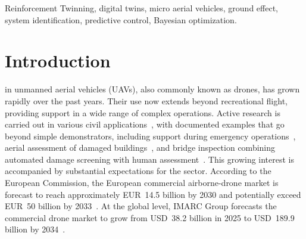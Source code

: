 \documentclass[journal]{IEEEtran}
\begin{document}
\begin{IEEEkeywords}Reinforcement Twinning, digital twins, micro aerial vehicles, ground effect, system identification, predictive control, Bayesian optimization.\end{IEEEkeywords}

\IEEEpeerreviewmaketitle

\section{Introduction}
\label{Introduction}

 in unmanned aerial vehicles (UAVs), also commonly known as drones, has grown rapidly over the past years. Their use now extends beyond recreational flight, providing support in a wide range of complex operations. Active research is carried out in various civil applications~\cite{Shakhatreh2019}, with documented examples that go beyond simple demonstrators, including support during emergency operations~\cite{Ray2022}, aerial assessment of damaged buildings~\cite{Surmann2024}, and bridge inspection combining automated damage screening with human assessment~\cite{Bartczak2025}.
This growing interest is accompanied by substantial expectations for the sector. According to the European Commission, the European commercial airborne-drone market is forecast to reach approximately EUR~14.5 billion by 2030 and potentially exceed EUR~50 billion by 2033~\cite{EuropeanCommission2026}. At the global level, IMARC Group forecasts the commercial drone market to grow from USD~38.2 billion in 2025 to USD~189.9 billion by 2034~\cite{IMARC2026}.
\end{document}
